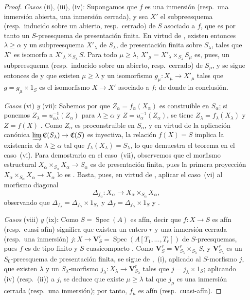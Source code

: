 \begin{proof}
\emph{Casos} (ii), (iii), (iv): Supongamos que $f$ es una inmersión (resp.\ una inmersión abierta, una inmersión cerrada), y sea $X'$ el subpreesquema (resp.\ inducido sobre un abierto, resp.\ cerrado) de $S$ asociado a $f$, que es por tanto un $S$-preesquema de presentación finita.
En virtud de , existen entonces $\lambda\geqslant\alpha$ y un subpreesquema $X'_\lambda$ de $S_\lambda$, de presentación finita sobre $S_\lambda$, tales que $X'$ es isomorfo a $X'_\lambda\times_{S_\lambda}S$.
Para todo $\mu\geqslant\lambda$, $X'_\mu=X'_\lambda\times_{S_\lambda}S_\mu$ es, pues, un subpreesquema (resp.\ inducido sobre un abierto, resp.\ cerrado) de $S_\mu$, y se sigue entonces de  y  que existen $\mu\geqslant\lambda$ y un isomorfismo $g_\mu:X_\mu\to X'_\mu$ tales que $g=g_\mu\times 1_S$ es el isomorfismo $X\to X'$ asociado a $f$; de donde la conclusión.

\emph{Casos} (vi) \emph{y} (vii): Sabemos por  que $Z_\alpha=f_\alpha(X_\alpha)$ es construible en $S_\alpha$; si ponemos $Z_\lambda=u_{\alpha\lambda}^{-1}(Z_\alpha)$ para $\lambda\geqslant\alpha$ y $Z=u_\alpha^{-1}(Z_\alpha)$, se tiene $Z_\lambda=f_\lambda(X_\lambda)$ y $Z=f(X)$ .
Como $Z_\alpha$ es proconstruible en $S_\alpha$, y en virtud de  la aplicación canónica $\varinjlim\mathfrak{C}(S_\lambda)\to\mathfrak{C}(S)$ es inyectiva, la relación $f(X)=S$ implica la existencia de $\lambda\geqslant\alpha$ tal que $f_\lambda(X_\lambda)=S_\lambda$, lo que demuestra el teorema en el caso~(vi).
Para demostrarlo en el caso~(vii), observemos que el morfismo estructural $X_\alpha\times_{S_\alpha}X_\alpha\to S_\alpha$ es de presentación finita, pues la primera proyección $X_\alpha\times_{S_\alpha}X_\alpha\to X_\alpha$ lo es . Basta, pues, en virtud de , aplicar el caso~(vi) al morfismo diagonal
\[
  \Delta_{f_\alpha}:X_\alpha\longrightarrow X_\alpha\times_{S_\alpha}X_\alpha,
\]
observando que $\Delta_{f_\lambda}=\Delta_{f_\alpha}\times1_{S_\lambda}$ y $\Delta_f=\Delta_{f_\alpha}\times1_S$  y .

\emph{Casos} (viii) \emph{y} (ix): Como $S=\operatorname{Spec}(A)$ es afín, decir que $f:X\to S$ es afín (resp.\ cuasi-afín) significa que existen un entero $r$ y una inmersión cerrada (resp.\ una inmersión) $j:X\to\mathbf{V}^r_S=\operatorname{Spec}(A[T_1,\ldots,T_r])$ de $S$-preesquemas, pues $f$ es de tipo finito y $S$ cuasicompacto .
Como $\mathbf{V}^r_S=\mathbf{V}^r_{S_\lambda}\times_{S_\lambda}S$, y $\mathbf{V}^r_{S_\lambda}$ es un $S_0$-preesquema de presentación finita, se sigue de ,~(i), aplicado al $S$-morfismo $j$, que existen $\lambda$ y un $S_\lambda$-morfismo $j_\lambda:X_\lambda\to\mathbf{V}^r_{S_\lambda}$ tales que $j=j_\lambda\times 1_S$; aplicando (iv) (resp.\ (ii)) a $j$, se deduce que existe $\mu\geqslant\lambda$ tal que $j_\mu$ es una inmersión cerrada (resp.\ una inmersión); por tanto, $f_\mu$ es afín (resp.\ cuasi-afín).


\end{proof}
